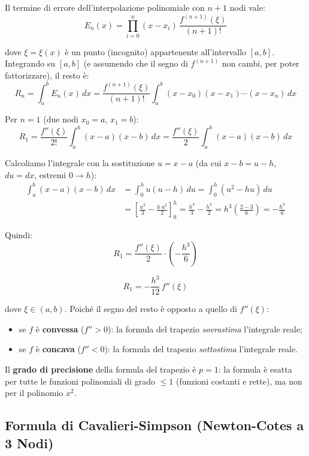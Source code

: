 \documentclass[a4paper,12pt]{article}
\theoremstyle{definition}
\theoremstyle{remark}
\begin{document}
Il termine di errore dell'interpolazione polinomiale con $n+1$ nodi vale:
\[
  E_n(x) = \prod_{i=0}^{n}(x - x_i)\,\frac{f^{(n+1)}(\xi)}{(n+1)!}
\]

\noindent dove $\xi = \xi(x)$ è un punto (incognito) appartenente
all'intervallo $[a,b]$.
Integrando su $[a,b]$ (e assumendo che il segno di
$f^{(n+1)}$ non cambi, per poter fattorizzare), il resto è:
\begin{equation}
  R_n = \int_a^b E_n(x)\,dx
      = \frac{f^{(n+1)}(\xi)}{(n+1)!}
        \int_a^b (x-x_0)(x-x_1)\cdots(x-x_n)\,dx
  \label{eq:errore-gen}
\end{equation}

\noindent Per $n = 1$ (due nodi $x_0 = a$, $x_1 = b$):
\[
  R_1 = \frac{f''(\xi)}{2!}\int_a^b (x - a)(x - b)\,dx
      = \frac{f''(\xi)}{2}\int_a^b (x-a)(x-b)\,dx
\]

\noindent Calcoliamo l'integrale con la sostituzione $u = x - a$
(da cui $x - b = u - h$, $du = dx$, estremi $0 \to h$):
\begin{align*}
  \int_a^b (x-a)(x-b)\,dx
  &= \int_0^h u(u - h)\,du
   = \int_0^h (u^2 - hu)\,du \\
  &= \left[\frac{u^3}{3} - \frac{h\,u^2}{2}\right]_0^h
   = \frac{h^3}{3} - \frac{h^3}{2}
   = h^3\!\left(\frac{2-3}{6}\right)
   = -\frac{h^3}{6}
\end{align*}

\noindent Quindi:
\[
  R_1 = \frac{f''(\xi)}{2} \cdot \left(-\frac{h^3}{6}\right)
\]

\begin{equation}
  \boxed{R_1 = -\frac{h^3}{12}\,f''(\xi)}
  \label{eq:errore-trapezio}
\end{equation}

\noindent dove $\xi \in (a,b)$.
Poiché il segno del resto è opposto a quello di $f''(\xi)$:
\begin{itemize}
  \item se $f$ è \textbf{convessa} ($f'' > 0$): la formula del trapezio
        \emph{sovrastima} l'integrale reale;
  \item se $f$ è \textbf{concava} ($f'' < 0$): la formula del trapezio
        \emph{sottostima} l'integrale reale.
\end{itemize}

Il \textbf{grado di precisione} della formula del trapezio è $p = 1$:
la formula è esatta per tutte le funzioni polinomiali di grado $\le 1$
(funzioni costanti e rette), ma non per il polinomio $x^2$.

\subsection{Formula di Cavalieri-Simpson (Newton-Cotes a 3 Nodi)}
\end{document}
